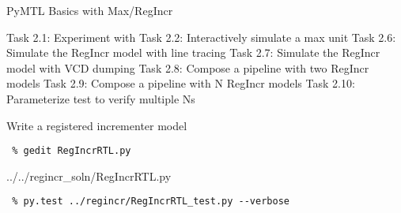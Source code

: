 %
%
%
%
%

\begin{frame}{ PyMTL Basics with Max/RegIncr}
\begin{cbxlist}
  \1 Task 2.1: Experiment with 
  \1 Task 2.2: Interactively simulate a max unit
  \1 
  \1 
  \1 
  \1 Task 2.6: Simulate the RegIncr model with line tracing
  \1 Task 2.7: Simulate the RegIncr model with VCD dumping
  \1 Task 2.8: Compose a pipeline with two RegIncr models
  \1 Task 2.9: Compose a pipeline with N RegIncr models
  \1 Task 2.10: Parameterize test to verify multiple Ns
\end{cbxlist}
\end{frame}

\begin{task}\begin{frame}[fragile]{Write a registered incrementer model}

\vspace{-0.15in}
\begin{Verbatim}[commandchars=\\\{\}]
 % cd    \midtilde/regincr
 % gedit RegIncrRTL.py
\end{Verbatim}
\vspace{-0.17in}

%
{../../regincr_soln/RegIncrRTL.py}

\vspace{-0.2in}
\begin{Verbatim}
 % py.test ../regincr/RegIncrRTL_test.py --verbose
\end{Verbatim}
\end{frame}
\end{task}

